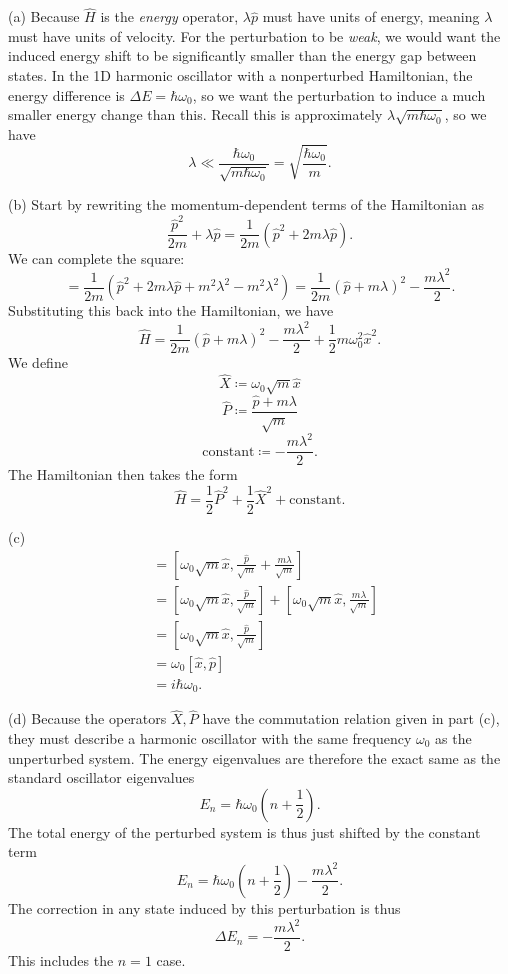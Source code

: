 \documentclass[11pt, letterpaper]{article}
\begin{document}
(a) Because $\hat{H} $ is the \emph{energy} operator, $\lambda \hat{p} $ must have units of energy, meaning $\lambda $ must have units of velocity. For the perturbation to be \emph{weak}, we would want the induced energy shift to be significantly smaller than the energy gap between states. In the 1D harmonic oscillator with a nonperturbed Hamiltonian, the energy difference is $\Delta E=\hbar \omega _0$, so we want the perturbation to induce a much smaller energy change than this. Recall this is approximately $\lambda \sqrt{m\hbar\omega _0} $, so we have
\[
	\lambda \ll \frac{\hbar \omega _0}{\sqrt{m\hbar \omega _0} } =\sqrt{\frac{\hbar\omega _0}{m}}
.\]


(b) Start by rewriting the momentum-dependent terms of the Hamiltonian as
\[
	\frac{\hat{p} ^2}{2m} +\lambda \hat{p} =\frac{1}{2m} \left( \hat{p} ^2 + 2m\lambda \hat{p}  \right) 
.\]
We can complete the square:
\[
	=\frac{1}{2m} \left( \hat{p} ^2 + 2m\lambda \hat{p} +m^2\lambda ^2-m^2\lambda ^2 \right) =\frac{1}{2m} \left( \hat{p} +m\lambda  \right) ^2 - \frac{m\lambda^2 }{2} 
.\]
Substituting this back into the Hamiltonian, we have
\[
	\hat{H} =\frac{1}{2m} \left( \hat{p} + m\lambda  \right) ^2-\frac{m\lambda^2 }{2} +\frac{1}{2} m\omega _0^2 \hat{x} ^2
.\]
We define
\[
	\hat{X} \coloneqq \omega _0 \sqrt{m} \hat{x} 
\]
\[
	\hat{P} \coloneqq \frac{\hat{p} +m\lambda }{\sqrt{m} } 
\]
\[
	\text{constant} \coloneqq -\frac{m\lambda^2 }{2} 
.\]
The Hamiltonian then takes the form
\[
	\hat{H} =\frac{1}{2} \hat{P} ^2 + \frac{1}{2} \hat{X} ^2 + \text{constant} 
.\]

(c)
\begin{align*}
	[\hat{X} ,\hat{P} ]&=\left[ \omega _0 \sqrt{m} \hat{x} ,\frac{\hat{p} }{\sqrt{m}  } +\frac{m\lambda }{\sqrt{m} } \right] \\
			   &=\left[ \omega _0 \sqrt{m} \hat{x}, \frac{\hat{p} }{\sqrt{m} }   \right] + \left[ \omega _0 \sqrt{m} \hat{x} , \frac{m\lambda }{\sqrt{m} }  \right] \\
			   &=\left[ \omega _0 \sqrt{m} \hat{x} ,\frac{\hat{p} }{\sqrt{m} }  \right] \\
			   &=\omega _0 \left[ \hat{x} ,\hat{p}  \right] \\
			   &=i\hbar \omega _0
.\end{align*}

(d) Because the operators $\hat{X} ,\hat{P} $ have the commutation relation given in part (c), they must describe a harmonic oscillator with the same frequency $\omega _0$ as the unperturbed system. The energy eigenvalues are therefore the exact same as the standard oscillator eigenvalues
\[
	E_n=\hbar \omega _0\left( n+\frac{1}{2}  \right) 
.\]
The total energy of the perturbed system is thus just shifted by the constant term
\[
	E_n = \hbar\omega _0\left( n+\frac{1}{2}  \right) -\frac{m\lambda ^2}{2} 
.\]
The correction in any state induced by this perturbation is thus
\[
	\Delta E_n = -\frac{m\lambda ^2}{2} 
.\]
This includes the $n=1$ case.
\end{document}

